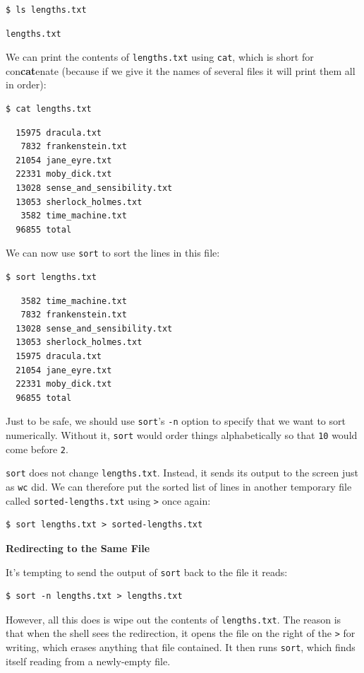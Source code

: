 \documentclass[
]{krantz}
\renewenvironment{quote}{\begin{VF}}{\end{VF}}
\begin{document}
\begin{verbatim}
$ ls lengths.txt
\end{verbatim}

\begin{verbatim}
lengths.txt
\end{verbatim}

We can print the contents of \texttt{lengths.txt} using \texttt{cat},
which is short for con\textbf{cat}enate
(because if we give it the names of several files
it will print them all in order):

\begin{verbatim}
$ cat lengths.txt
\end{verbatim}

\begin{verbatim}
  15975 dracula.txt
   7832 frankenstein.txt
  21054 jane_eyre.txt
  22331 moby_dick.txt
  13028 sense_and_sensibility.txt
  13053 sherlock_holmes.txt
   3582 time_machine.txt
  96855 total
\end{verbatim}

We can now use \texttt{sort} to sort the lines in this file:

\begin{verbatim}
$ sort lengths.txt
\end{verbatim}

\begin{verbatim}
   3582 time_machine.txt
   7832 frankenstein.txt
  13028 sense_and_sensibility.txt
  13053 sherlock_holmes.txt
  15975 dracula.txt
  21054 jane_eyre.txt
  22331 moby_dick.txt
  96855 total
\end{verbatim}

Just to be safe,
we should use \texttt{sort}'s \texttt{-n} option to specify that we want to sort numerically.
Without it,
\texttt{sort} would order things alphabetically
so that \texttt{10} would come before \texttt{2}.

\texttt{sort} does not change \texttt{lengths.txt}.
Instead,
it sends its output to the screen just as \texttt{wc} did.
We can therefore put the sorted list of lines in another temporary file called \texttt{sorted-lengths.txt}
using \texttt{\textgreater{}} once again:

\begin{verbatim}
$ sort lengths.txt > sorted-lengths.txt
\end{verbatim}

\begin{quote}
\textbf{Redirecting to the Same File}

It's tempting to send the output of \texttt{sort} back to the file it reads:

\begin{verbatim}
$ sort -n lengths.txt > lengths.txt
\end{verbatim}

However, all this does is wipe out the contents of \texttt{lengths.txt}.
The reason is that when the shell sees the redirection,
it opens the file on the right of the \texttt{\textgreater{}} for writing,
which erases anything that file contained.
It then runs \texttt{sort}, which finds itself reading from a newly-empty file.
\end{quote}
\end{document}
